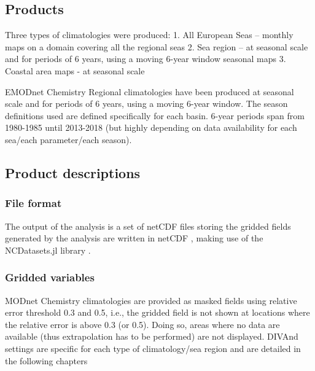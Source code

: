 \documentclass[essd, manuscript]{copernicus}
\begin{document}
\citep{BUGA2021}

\subsection{Products}

Three types of climatologies were produced:
1. All European Seas – monthly maps on a domain covering all the regional seas
2. Sea region – at seasonal scale and for periods of 6 years, using a moving 6-year window
seasonal maps
3. Coastal area maps - at seasonal scale

EMODnet Chemistry Regional climatologies have been produced at seasonal scale and for periods of 6 years,
using a moving 6-year window. The season definitions used are defined specifically for each basin. 6-year
periods span from 1980-1985 until 2013-2018 (but highly depending on data availability for each sea/each
parameter/each season). 

\subsection{Product descriptions}

\subsubsection{File format}

The output of the analysis is a set of netCDF files storing the gridded fields generated by the analysis are written in netCDF \citep{Rew1990,Brown1993}, making use of the NCDatasets.jl library \citep{Barth2024}.

\subsubsection{Gridded variables}

MODnet Chemistry climatologies are provided as masked fields using relative error threshold 0.3 and
0.5, i.e., the gridded field is not shown at locations where the relative error is above 0.3 (or 0.5). Doing
so, areas where no data are available (thus extrapolation has to be performed) are not displayed. DIVAnd
settings are specific for each type of climatology/sea region and are detailed in the following chapters
\end{document}
